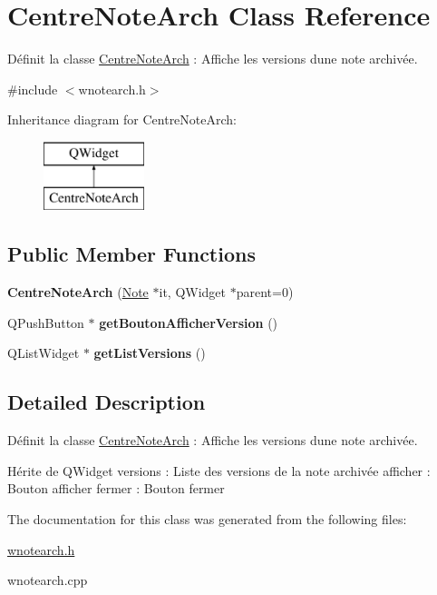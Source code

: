 \hypertarget{class_centre_note_arch}{}\section{Centre\+Note\+Arch Class Reference}
\label{class_centre_note_arch}


Définit la classe \hyperlink{class_centre_note_arch}{Centre\+Note\+Arch} \+: Affiche les versions d\textquotesingle{}une note archivée.  




{\ttfamily \#include $<$wnotearch.\+h$>$}

Inheritance diagram for Centre\+Note\+Arch\+:\begin{figure}[H]
\begin{center}
\leavevmode
\includegraphics[height=2.000000cm]{class_centre_note_arch}
\end{center}
\end{figure}
\subsection*{Public Member Functions}
\begin{DoxyCompactItemize}
\item 
\mbox{\label{class_centre_note_arch_a82abbbbdd856c6ce44b320491eb8c530}} 
{\bfseries Centre\+Note\+Arch} (\hyperlink{class_note}{Note} $\ast$it, Q\+Widget $\ast$parent=0)
\item 
\mbox{\label{class_centre_note_arch_afb5b8d5f902f8ca3f0ca8f36b872638e}} 
Q\+Push\+Button $\ast$ {\bfseries get\+Bouton\+Afficher\+Version} ()
\item 
\mbox{\label{class_centre_note_arch_ab7c56ce1b22a9e95cc2b6363e30adf96}} 
Q\+List\+Widget $\ast$ {\bfseries get\+List\+Versions} ()
\end{DoxyCompactItemize}


\subsection{Detailed Description}
Définit la classe \hyperlink{class_centre_note_arch}{Centre\+Note\+Arch} \+: Affiche les versions d\textquotesingle{}une note archivée. 

Hérite de Q\+Widget versions \+: Liste des versions de la note archivée afficher \+: Bouton afficher fermer \+: Bouton fermer 

The documentation for this class was generated from the following files\+:\begin{DoxyCompactItemize}
\item 
\hyperlink{wnotearch_8h}{wnotearch.\+h}\item 
wnotearch.\+cpp\end{DoxyCompactItemize}
